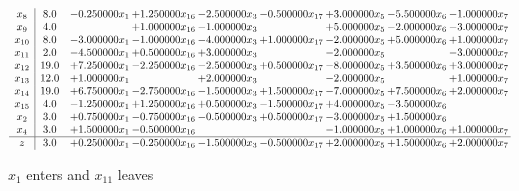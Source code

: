 \documentclass[10pt]{article}
\begin{document}
 \[\begin{array}{c| c c@{\hskip 2pt} c@{\hskip 2pt} c@{\hskip 2pt} c@{\hskip 2pt} c@{\hskip 2pt} c@{\hskip 2pt} c@{\hskip 2pt} }
 x_{8}   &  8.0 & -0.250000 x_{1} & + 1.250000 x_{16} & -2.500000 x_{3} & -0.500000 x_{17} & + 3.000000 x_{5} & -5.500000 x_{6} & -1.000000 x_{7}\\
 x_{9}   &  4.0  &   & + 1.000000 x_{16} & -1.000000 x_{3} &   & + 5.000000 x_{5} & -2.000000 x_{6} & -3.000000 x_{7}\\
 x_{10}   &  8.0 & -3.000000 x_{1} & -1.000000 x_{16} & -4.000000 x_{3} & + 1.000000 x_{17} & -2.000000 x_{5} & + 5.000000 x_{6} & + 1.000000 x_{7}\\
 x_{11}   &  2.0 & -4.500000 x_{1} & + 0.500000 x_{16} & + 3.000000 x_{3} &   & -2.000000 x_{5} &   & -3.000000 x_{7}\\
 x_{12}   &  19.0 & + 7.250000 x_{1} & -2.250000 x_{16} & -2.500000 x_{3} & + 0.500000 x_{17} & -8.000000 x_{5} & + 3.500000 x_{6} & + 3.000000 x_{7}\\
 x_{13}   &  12.0 & + 1.000000 x_{1} &   & + 2.000000 x_{3} &   & -2.000000 x_{5} &   & + 1.000000 x_{7}\\
 x_{14}   &  19.0 & + 6.750000 x_{1} & -2.750000 x_{16} & -1.500000 x_{3} & + 1.500000 x_{17} & -7.000000 x_{5} & + 7.500000 x_{6} & + 2.000000 x_{7}\\
 x_{15}   &  4.0 & -1.250000 x_{1} & + 1.250000 x_{16} & + 0.500000 x_{3} & -1.500000 x_{17} & + 4.000000 x_{5} & -3.500000 x_{6} &   \\
 x_{2}   &  3.0 & + 0.750000 x_{1} & -0.750000 x_{16} & -0.500000 x_{3} & + 0.500000 x_{17} & -3.000000 x_{5} & + 1.500000 x_{6} &   \\
 x_{4}   &  3.0 & + 1.500000 x_{1} & -0.500000 x_{16} &    &   & -1.000000 x_{5} & + 1.000000 x_{6} & + 1.000000 x_{7}\\
\hline
z    &  3.0 & + 0.250000 x_{1} & -0.250000 x_{16} & -1.500000 x_{3} & -0.500000 x_{17} & + 2.000000 x_{5} & + 1.500000 x_{6} & + 2.000000 x_{7}\\
\end{array}\]


 $ x_{1} $ enters and $ x_{11} $ leaves 
\end{document}
